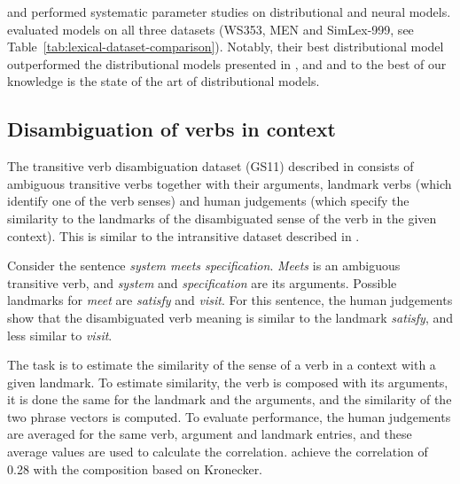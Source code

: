 
 and  performed systematic parameter studies on distributional and neural models.  evaluated models on all three datasets (WS353, MEN and SimLex-999, see Table~\ref{tab:lexical-dataset-comparison}). Notably, their best distributional model outperformed the distributional models presented in \citet{hill2014simlex}, \citet{kiela-clark:2014:CVSC} and \citet{baroni-dinu-kruszewski:2014:P14-1} and to the best of our knowledge is the state of the art of distributional models.

\subsection{Disambiguation of verbs in context}
\label{sec:disamb}

The transitive verb disambiguation dataset (GS11)
described in \citet{Grefenstette:2011:ETV:2140490.2140497,Grefenstette:2011:ESC:2145432.2145580} consists of ambiguous transitive verbs together with their arguments, landmark verbs (which identify one of the verb senses) and human judgements (which specify the similarity to the landmarks of the disambiguated sense of the verb in the given context). This is similar to the intransitive dataset described in .

Consider the sentence \textit{system meets specification}. \textit{Meets} is an ambiguous transitive verb, and \textit{system}
and \textit{specification} are its arguments. Possible landmarks for \emph{meet} are \textit{satisfy} and \textit{visit}. For this sentence, the human judgements show that the disambiguated verb meaning is similar to the landmark \textit{satisfy}, and less similar to \textit{visit}.

The task is to estimate the similarity of the sense of a verb in a context with a given landmark. To estimate similarity, the verb is composed with its arguments, it is done the same for the landmark and the arguments, and the similarity of the two phrase vectors is computed. To evaluate performance, the human judgements are averaged for the same verb, argument and landmark entries, and these average values are used to calculate the correlation. \citet{Grefenstette:2011:ETV:2140490.2140497} achieve the correlation of 0.28 with the composition based on Kronecker.

